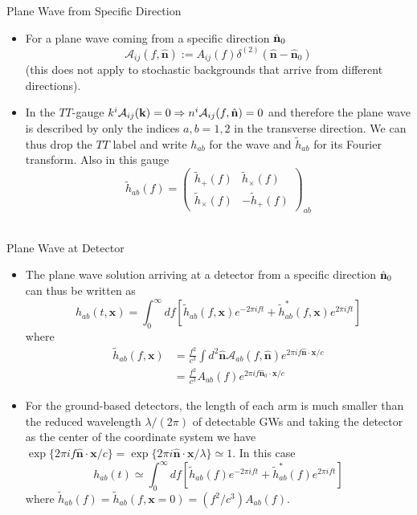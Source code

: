 \documentclass[size=11pt,style=paintings]{powerdot}
\begin{document}
 
 \begin{slide}{Plane Wave from Specific Direction}
 \begin{itemize}
 \item For a plane wave coming from a specific direction $\hat {\bf n}_0$
$$ \boxed{ \mathcal{A}_{i j}(f,\mathbf{\hat n}):=A_{i j}(f) \delta^{(2)}\left(\hat{\mathbf{n}}-\hat{\mathbf{n}}_{0}\right) }$$
(this does not apply to stochastic backgrounds that arrive from different directions).
\vspace{0.3cm}
\item In the $TT$-gauge \(k^{i} \mathcal{A}_{i j}(\mathbf{k})=0 \Rightarrow n^{i} \mathcal{A}_{i j}(f,\hat {\bf n})=0 \) and 
therefore the plane wave is described by only the indices \(a, b=1,2\) in the transverse direction.
We can thus drop the $TT$ label and write $h_{ab}$ for the wave and $\tilde h_{ab} $ for its Fourier transform. Also in this gauge 
$$
\tilde{h}_{a b}(f)=\left(\begin{array}{cc}{\tilde{h}_{+}(f)} & {\tilde{h}_{\times}(f)} \\ {\tilde{h}_{\times}(f)} & {-\tilde{h}_{+}(f)}\end{array}\right)_{a b}
$$
\ \end{itemize}
 \end{slide}
 
 
 \begin{slide}{Plane Wave at Detector}
 \begin{itemize}
 \item The plane wave solution arriving at a detector from a specific direction $\hat {\bf n}_0$ can thus be written as
\vspace{-0.2cm}
$$
h_{a b}(t, \mathbf{x})=\int_{0}^{\infty} d f\left[\tilde{h}_{a b}(f, \mathbf{x}) e^{-2 \pi i f t}+\tilde{h}_{a b}^{*}(f, \mathbf{x}) e^{2 \pi i f t}\right]
$$
\vspace{-0.3cm}
where
$$
\begin{aligned} \tilde{h}_{a b}(f, \mathbf{x}) &=\frac{f^{2}}{c^{3}} \int d^{2} \hat{\mathbf{n}} \mathcal{A}_{a b}(f, \hat{\mathbf{n}}) e^{2 \pi i f \hat{\mathbf{n}} \cdot \mathbf{x} / c} \\ &=\frac{f^{2}}{c^{3}} A_{a b}(f) e^{2 \pi i f \hat{\mathbf{n}}_{0} \cdot \mathbf{x} / c} \end{aligned}
$$
\vspace{-0.2cm}
\item For the ground-based detectors, the length of each arm is much smaller than the reduced wavelength $\lambda/(2\pi)$ of detectable GWs and taking the detector as the center of the coordinate system we have \(\exp \{2 \pi i f \hat{\mathbf{n}} \cdot \mathbf{x} / c\}= \exp \{2 \pi i \hat{\mathbf{n}} \cdot \mathbf{x} / \lambda\} \simeq 1\).
In this case
\vspace{-0.2cm}
$$\boxed{h_{a b}(t)\simeq\int_{0}^{\infty} d f\left[\tilde{h}_{a b}(f) e^{-2 \pi i f t}+\tilde{h}_{a b}^{*}(f) e^{2 \pi i f t}\right]}$$ 
where $\tilde{h}_{a b}(f)=\tilde{h}_{a b}(f, \mathbf{x}=0)=(f^{2}/c^{3}) A_{a b}(f)$.

 \end{itemize}
 \end{slide}
 
\end{document}
